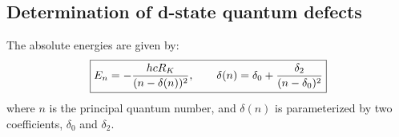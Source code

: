\documentclass[landscape]{sciposter}
\begin{document}
\begin{multicols}{4}

\section*{\large Determination of d-state quantum defects}
The absolute energies are given by:
\begin{align*}
\boxed{E_n = -\frac{hcR_K}{(n - \delta(n))^2}, \hspace{0.7cm} \delta(n) = \delta_0 + \frac{\delta_2}{(n-\delta_0)^2}}
\end{align*}
where $n$ is the principal quantum number, and $\delta(n)$ is parameterized by two coefficients, $\delta_0$ and $\delta_2$.



\end{multicols}
\end{document}
